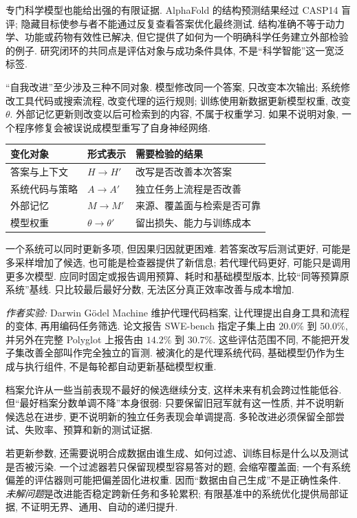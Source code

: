 专门科学模型也能给出强的有限证据. AlphaFold 的结构预测结果经过 CASP14 盲评\cite{alphafold}; 隐藏目标使参与者不能通过反复查看答案优化最终测试. 结构准确不等于动力学、功能或药物有效性已解决, 但它提供了如何为一个明确科学任务建立外部检验的例子. 研究闭环的共同点是评估对象与成功条件具体, 不是“科学智能”这一宽泛标签.

“自我改进”至少涉及三种不同对象. 模型修改同一个答案, 只改变本次输出; 系统修改工具代码或搜索流程, 改变代理的运行规则; 训练使用新数据更新模型权重, 改变 $\theta$. 外部记忆更新则改变以后可检索到的内容, 不属于权重学习. 如果不说明对象, 一个程序修复会被误说成模型重写了自身神经网络.

\begin{center}
\begin{tabular}{lll}\toprule
变化对象 & 形式表示 & 需要检验的结果\\\midrule
答案与上下文 & $H\to H'$ & 改写是否改善本次答案\\
系统代码与策略 & $A\to A'$ & 独立任务上流程是否改善\\
外部记忆 & $M\to M'$ & 来源、覆盖面与检索是否可靠\\
模型权重 & $\theta\to\theta'$ & 留出损失、能力与训练成本\\\bottomrule
\end{tabular}
\end{center}
一个系统可以同时更新多项, 但因果归因就更困难. 若答案改写后测试更好, 可能是多采样增加了候选, 也可能是检查器提供了新信息; 若代理代码更好, 可能只是调用更多次模型. 应同时固定或报告调用预算、耗时和基础模型版本, 比较“同等预算原系统”基线. 只比较最后最好分数, 无法区分真正效率改善与成本增加.

\emph{作者实验:} Darwin Gödel Machine 维护代理代码档案, 让代理提出自身工具和流程的变体, 再用编码任务筛选\cite{dgm}. 论文报告 SWE-bench 指定子集上由 $20.0\%$ 到 $50.0\%$, 并另外在完整 Polyglot 上报告由 $14.2\%$ 到 $30.7\%$. 这些评估范围不同, 不能把开发子集改善全部叫作完全独立的盲测. 被演化的是代理系统代码, 基础模型仍作为生成与执行组件, 不是每轮都自动更新基础模型权重.

档案允许从一些当前表现不最好的候选继续分支, 这样未来有机会跨过性能低谷. 但“最好档案分数单调不降”本身很弱: 只要保留旧冠军就有这一性质, 并不说明新候选总在进步, 更不说明新的独立任务表现会单调提高. 多轮改进必须保留全部尝试、失败率、预算和新的测试证据.

若更新参数, 还需要说明合成数据由谁生成、如何过滤、训练目标是什么以及测试是否被污染. 一个过滤器若只保留现模型容易答对的题, 会缩窄覆盖面; 一个有系统偏差的评估器则可能把偏差固化进权重. 因而“数据由自己生成”不是正确性条件. \emph{未解问题}是改进能否稳定跨新任务和多轮累积; 有限基准中的系统优化提供局部证据, 不证明无界、通用、自动的递归提升.

